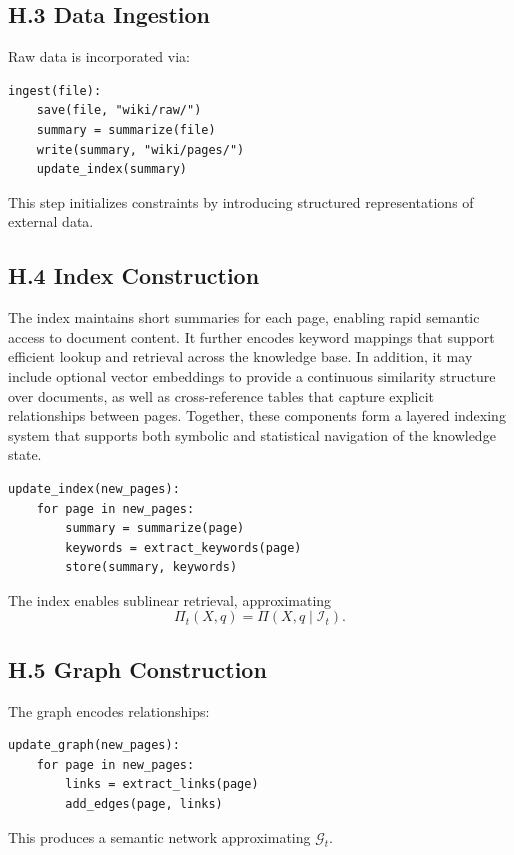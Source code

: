 \documentclass[12pt, oneside]{article}
\theoremstyle{plain}
\theoremstyle{definition}
\theoremstyle{remark}
\begin{document}
\subsection{H.3 Data Ingestion}

Raw data is incorporated via:
\begin{verbatim}
ingest(file):
    save(file, "wiki/raw/")
    summary = summarize(file)
    write(summary, "wiki/pages/")
    update_index(summary)
\end{verbatim}

This step initializes constraints by introducing structured representations of external data.

\subsection{H.4 Index Construction}

The index maintains short summaries for each page, enabling rapid semantic access to document content. It further encodes keyword mappings that support efficient lookup and retrieval across the knowledge base. In addition, it may include optional vector embeddings to provide a continuous similarity structure over documents, as well as cross-reference tables that capture explicit relationships between pages. Together, these components form a layered indexing system that supports both symbolic and statistical navigation of the knowledge state.

\begin{verbatim}
update_index(new_pages):
    for page in new_pages:
        summary = summarize(page)
        keywords = extract_keywords(page)
        store(summary, keywords)
\end{verbatim}

The index enables sublinear retrieval, approximating
\[
\Pi_t(X, q) = \Pi(X, q \mid \mathcal{I}_t).
\]

\subsection{H.5 Graph Construction}

The graph encodes relationships:

\begin{verbatim}
update_graph(new_pages):
    for page in new_pages:
        links = extract_links(page)
        add_edges(page, links)
\end{verbatim}

This produces a semantic network approximating $\mathcal{G}_t$.
\end{document}
